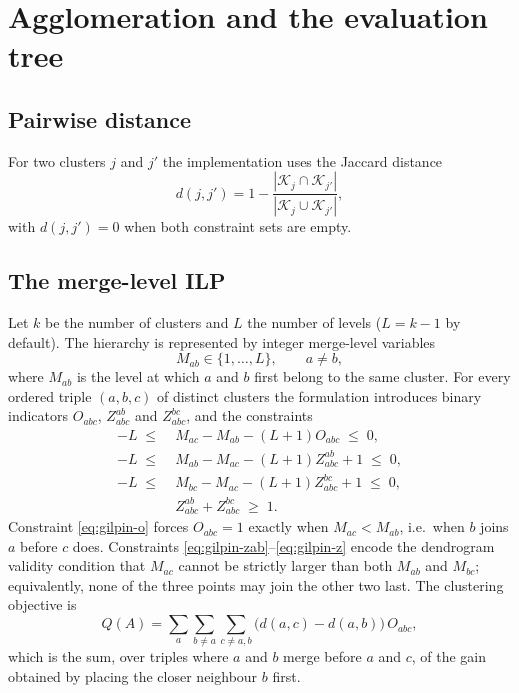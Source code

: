\documentclass[11pt,a4paper]{article}
\newcommand{\cK}{\mathcal{K}}
\begin{document}
\section{Agglomeration and the evaluation tree}
\label{sec:agglomeration}

\subsection{Pairwise distance}
For two clusters $j$ and $j'$ the implementation uses the Jaccard distance
\begin{equation}
d(j,j')=1-\frac{|\cK_j\cap\cK_{j'}|}{|\cK_j\cup\cK_{j'}|},
\end{equation}
with $d(j,j')=0$ when both constraint sets are empty.

\subsection{The merge-level ILP}
Let $k$ be the number of clusters and $L$ the number of levels
($L=k-1$ by default). The hierarchy is represented by integer merge-level
variables
\begin{equation}
M_{ab}\in\{1,\dots,L\},\qquad a\ne b,
\end{equation}
where $M_{ab}$ is the level at which $a$ and $b$ first belong to the same
cluster. For every ordered triple $(a,b,c)$ of distinct clusters the
formulation introduces binary indicators $O_{abc}$, $Z^{ab}_{abc}$ and
$Z^{bc}_{abc}$, and the constraints
\begin{align}
-L\;\le\;&M_{ac}-M_{ab}-(L+1)O_{abc}\;\le\;0,
\label{eq:gilpin-o}\\
-L\;\le\;&M_{ab}-M_{ac}-(L+1)Z^{ab}_{abc}+1\;\le\;0,
\label{eq:gilpin-zab}\\
-L\;\le\;&M_{bc}-M_{ac}-(L+1)Z^{bc}_{abc}+1\;\le\;0,
\label{eq:gilpin-zbc}\\
&Z^{ab}_{abc}+Z^{bc}_{abc}\;\ge\;1.
\label{eq:gilpin-z}
\end{align}
Constraint \eqref{eq:gilpin-o} forces $O_{abc}=1$ exactly when
$M_{ac}<M_{ab}$, i.e.\ when $b$ joins $a$ before $c$ does.
Constraints \eqref{eq:gilpin-zab}--\eqref{eq:gilpin-z} encode the dendrogram
validity condition that $M_{ac}$ cannot be strictly larger than both $M_{ab}$
and $M_{bc}$; equivalently, none of the three points may join the other two
last. The clustering objective is
\begin{equation}
Q(A)=\sum_{a}\sum_{b\ne a}\sum_{c\ne a,b}
\bigl(d(a,c)-d(a,b)\bigr)\,O_{abc},
\label{eq:Q}
\end{equation}
which is the sum, over triples where $a$ and $b$ merge before $a$ and $c$, of
the gain obtained by placing the closer neighbour $b$ first.
\end{document}
